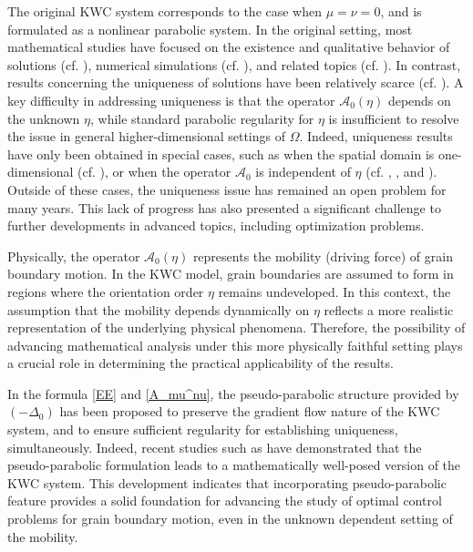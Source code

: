 \documentclass{sinst}
\numberwithin{equation}{section}
\theoremstyle{plain}
\theoremstyle{definition}
\begin{document}
The original KWC system corresponds to the case when $ \mu = \nu = 0 $, and is formulated as a nonlinear parabolic system. In the original setting, most mathematical studies have focused on the existence and qualitative behavior of solutions (cf. \cite{MR3670006,MR4677072,MR4683700,MR1720614,MR2469586,MR2548486,MR3038131,MR3362773,MR2836555,MR2668289,MR3155454,MR3268865,MR4352617}), numerical simulations (cf. \cite{MR1752970,MR1794359,MR3951294}), and related topics (cf. \cite{MR4395725,MR4218112,MR3888633,MR4806756,%
MR4529388,giga2024fractional,MR3937357,MR4603338,MR4809351}). In contrast, results concerning the uniqueness of solutions have been relatively scarce (cf. \cite{MR2469586,MR3155454,MR4218112,MR4395725}). A key difficulty in addressing uniqueness is that the operator $ \mathcal{A}_0(\eta) $ depends on the unknown $ \eta $, while standard parabolic regularity for $ \eta $ is insufficient to resolve the issue in general higher-dimensional settings of $ \Omega $. Indeed, uniqueness results have only been obtained in special cases, such as when the spatial domain is one-dimensional (cf. \cite[Theorem 2.2]{MR2469586}), or when the operator $ \mathcal{A}_0 $ is independent of $ \eta $ (cf. \cite[Main Theorem 1]{MR4218112}, \cite[Main Theorem 1]{MR4395725}, and \cite[Theorem 2.2]{MR3155454}). Outside of these cases, the uniqueness issue has remained an open problem for many years. This lack of progress has also presented a significant challenge to further developments in advanced topics, including optimization problems.

Physically, the operator $ \mathcal{A}_0(\eta) $ represents the mobility (driving force) of grain boundary motion. In the KWC model, grain boundaries are assumed to form in regions where the orientation order $ \eta $ remains undeveloped. In this context, the assumption that the mobility depends dynamically on $ \eta $ reflects a more realistic representation of the underlying physical phenomena. Therefore, the possibility of advancing mathematical analysis under this more physically faithful setting plays a crucial role in determining the practical applicability of the results.

In the formula \eqref{EE} and \eqref{A_mu^nu}, the pseudo-parabolic structure provided by $ (-\mathit{\Delta}_0) $ has been proposed to preserve the gradient flow nature of the KWC system, and to ensure sufficient regularity for establishing uniqueness, simultaneously. Indeed, recent studies such as \cite{mizuno2024weak,MR4683693,MR4797677} have demonstrated that the pseudo-parabolic formulation leads to a mathematically well-posed version of the KWC system. This development indicates that incorporating pseudo-parabolic feature provides a solid foundation for advancing the study of optimal control problems for grain boundary motion, even in the unknown dependent setting  of the mobility.
\end{document}
